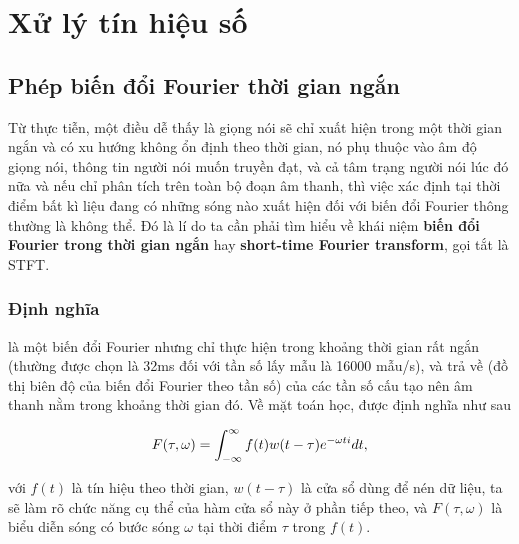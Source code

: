 \newcommand{\mathimg}[1]{parts/foundations/math/img/#1}
\setupfont{13pt}

\chapter{Xử lý tín hiệu số}	\label{chapter::signal_processing}
	
\section{Phép biến đổi Fourier thời gian ngắn}\label{section::signal_processing::stft}
	
	Từ thực tiễn, một điều dễ thấy là giọng nói sẽ chỉ xuất hiện trong một thời gian ngắn và có xu hướng không ổn định theo thời gian, nó phụ thuộc vào âm độ giọng nói, thông tin người nói muốn truyền đạt, và cả tâm trạng người nói lúc đó nữa và nếu chỉ phân tích trên toàn bộ đoạn âm thanh, thì việc xác định tại thời điểm bất kì liệu đang có những sóng nào xuất hiện đối với biến đổi Fourier thông thường là không thể. Đó là lí do ta cần phải tìm hiểu về khái niệm \textbf{biến đổi Fourier trong thời gian ngắn} hay \textbf{short-time Fourier transform}, gọi tắt là STFT.

	\subsection{Định nghĩa}\label{subsection::signal_processing::stft::def}
	
		 là một biến đổi Fourier nhưng chỉ thực hiện trong khoảng thời gian rất ngắn (thường được chọn là 32ms đối với tần số lấy mẫu là 16000 mẫu/s), và trả về \spectrum{} (đồ thị biên độ của biến đổi Fourier theo tần số) của các tần số cấu tạo nên âm thanh nằm trong khoảng thời gian đó. Về mặt toán học,  được định nghĩa như sau
		
			\begin{equation}
				F(\tau, \omega) = \int_{-\infty}^{\infty} f(t) w(t - \tau)e^{-\omega ti}dt,
			\label{stft::formula}
			\end{equation}
		
		\noindent với $f(t)$ là tín hiệu theo thời gian, $w(t - \tau)$ là cửa sổ dùng để nén dữ liệu, ta sẽ làm rõ chức năng cụ thể của hàm cửa sổ này ở phần tiếp theo, và $F(\tau, \omega)$ là biểu diễn sóng có bước sóng $\omega$ tại thời điểm $\tau$ trong $f(t)$.
		
